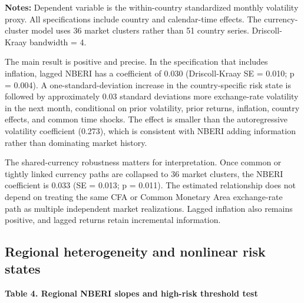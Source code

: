 \documentclass[11pt]{article}
\begin{document}
\textbf{Notes:} Dependent variable is the within-country standardized
monthly volatility proxy. All specifications include country and
calendar-time effects. The currency-cluster model uses 36 market
clusters rather than 51 country series. Driscoll-Kraay bandwidth = 4.

The main result is positive and precise. In the
specification that includes inflation, lagged NBERI has a coefficient of
0.030 (Driscoll-Kraay SE = 0.010; p = 0.004). A one-standard-deviation
increase in the country-specific risk state is followed by
approximately 0.03 standard deviations more exchange-rate volatility in
the next month, conditional on prior volatility, prior returns,
inflation, country effects, and common time shocks. The effect is
smaller than the autoregressive volatility coefficient (0.273), which is
consistent with NBERI adding information rather than dominating market
history.

The shared-currency robustness matters for interpretation. Once common
or tightly linked currency paths are collapsed to 36 market clusters,
the NBERI coefficient is 0.033 (SE = 0.013; p = 0.011). The estimated
relationship does not depend on treating the same CFA or
Common Monetary Area exchange-rate path as multiple independent market
realizations. Lagged inflation also remains positive, and lagged returns
retain incremental information.

\subsection{Regional heterogeneity and nonlinear risk
states}\label{regional-heterogeneity-and-nonlinear-risk-states}

\textbf{Table 4. Regional NBERI slopes and high-risk threshold test}
\end{document}
